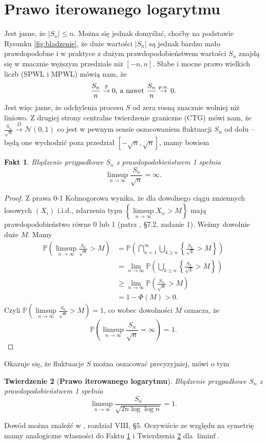 \documentclass[a4paper,11pt,twoside]{book}
\newcommand{\Prob}{\mathbb{P}}
\newcommand{\conv}{\rightarrow}
\newcommand{\norm}[2]{\mathcal{N}\left(#1, #2\right)}
\newtheorem{twier}{Twierdzenie}[chapter]
\newtheorem{fakt}[twier]{Fakt}
\theoremstyle{definition}
\begin{document}
\section{Prawo iterowanego logarytmu}
Jest jasne, że $|S_n| \leq n$. Można się jednak domyślać, choćby na podstawie Rysunku \ref{fig:bladzenie}, że duże wartości $|S_n|$ są jednak bardzo mało prawdopodobne i w praktyce z dużym prawdopodobieństwem wartości $S_n$ znajdą się w znacznie węższym przedziale niż $[-n, n]$. Słabe i mocne prawo wielkich liczb (SPWL i MPWL) mówią nam, że
\[\frac{S_n}{n} \stackrel{\Prob}{\rightarrow} 0 \hbox{, a nawet } \frac{S_n}{n} \stackrel{p.n.}{\rightarrow} 0.\] Jest więc jasne, że odchylenia procesu $S$ od zera rosną znacznie wolniej niż liniowo. Z drugiej strony centralne twierdzenie graniczne (CTG) mówi nam, że $\frac{S_n}{\sqrt{n}} \stackrel{D}{\rightarrow} \norm{0}{1}$
co jest w pewnym sensie oszacowaniem fluktuacji $S_n$ od dołu -- będą one wychodzić poza przedział $[-\sqrt{n}, \sqrt{n}]$, mamy bowiem
\begin{fakt}
\label{fakt:bladzenie_clt}
 Błądzenie przypadkowe $S_n$  z prawdopodobieństwem 1 spełnia \[ \limsup_{n \conv \infty} \frac{S_n}{\sqrt{n}} = \infty. \]
\end{fakt}
\begin{proof}
 Z prawa 0-1 Kołmogorowa wynika, że dla dowolnego ciągu zmiennych losowych $(X_i)$ i.i.d., zdarzenia typu $\left\{ \limsup\limits_{n \conv \infty} X_n > M \right\}$ mają prawdopodobieństwo równe 0 lub 1 (patrz \cite{jak-szt}, \S7.2, zadanie 1). Weźmy dowolnie duże $M$. Mamy
 \begin{align*}
  \Prob\left(\limsup_{n \conv \infty} \frac{S_n}{\sqrt{n}} > M \right)
  &= \Prob\left(\bigcap_{n=1}^\infty \bigcup_{k \geq n} \left\{ \frac{S_k}{\sqrt{k}} > M \right\} \right)\\
  &= \lim_{n \conv \infty} \Prob\left( \bigcup_{k \geq n} \left\{ \frac{S_k}{\sqrt{k}} > M \right\} \right) \\
  &\geq \lim_{n \conv \infty} \Prob\left(\frac{S_n}{\sqrt{n}} > M \right) \\
  &= 1 - \Phi(M) > 0.
 \end{align*}
 Czyli $\Prob\left(\limsup\limits_{n \conv \infty} \frac{S_n}{\sqrt{n}} > M \right) = 1$, co wobec dowolności $M$ oznacza, że \[ \Prob\left(\limsup_{n \conv \infty} \frac{S_n}{\sqrt{n}} = \infty \right) = 1. \]
\end{proof}

Okazuje się, że fluktuacje $S$ można oszacować precyzyjniej, mówi o tym
\begin{twier}[\textbf{Prawo iterowanego logarytmu}]
\label{tw:pil}
 Błądzenie przypadkowe $S_n$  z prawdopodobieństwem 1 spełnia \[ \limsup_{n \conv \infty} \frac{S_n}{ \sqrt{2 n \log \log n} } = 1. \]
\end{twier}
\noindent Dowód można znaleźć w \cite{feller}, rozdział VIII, \S5. Oczywiście ze względu na symetrię mamy analogiczne własności do Faktu \ref{fakt:bladzenie_clt} i Twierdzenia \ref{tw:pil} dla $\liminf$.
\end{document}
